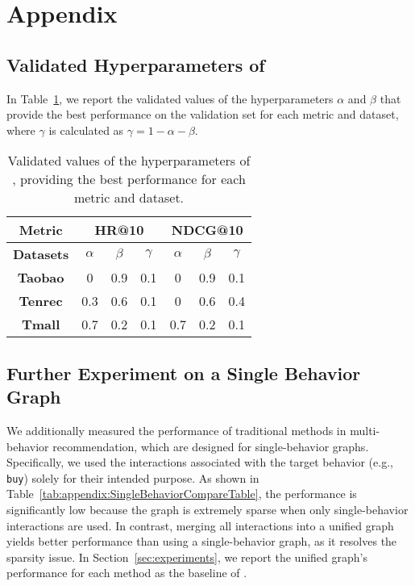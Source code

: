 \newpage
\appendix
\section{Appendix}
\label{sec:appendix}

\subsection{Validated Hyperparameters of \method}
\label{sec:appendix:Effect of Hyperparameters_detail}
In Table~\ref{tab:appendix:besthyperparameter}, we report the validated values of the hyperparameters $\alpha$ and $\beta$ that provide the best performance on the validation set for each metric and dataset, where $\gamma$ is calculated as $\gamma = 1 - \alpha - \beta$.

\setlength{\tabcolsep}{15pt}
\begin{table}[h!]
\small
\caption{
    Validated values of the hyperparameters of \method, providing the best performance for each metric and dataset.
}
\label{tab:appendix:besthyperparameter}
\centering
\begin{tabular}{c|ccc|ccc}
\hline
\toprule
\textbf{Metric}  & \multicolumn{3}{c|}{\textbf{HR@10}} & \multicolumn{3}{c}{\textbf{NDCG@10}} \\
\midrule
\textbf{Datasets} & $\alpha$ & $\beta$ & $\gamma$ & $\alpha$ & $\beta$ & $\gamma$  \\
\midrule
\textbf{Taobao}  & 0              & 0.9   & 0.1         & 0               & 0.9 & 0.1             \\
\textbf{Tenrec}  & 0.3            & 0.6   & 0.1         & 0               & 0.6 & 0.4 \\
\textbf{Tmall}   & 0.7            & 0.2   & 0.1         & 0.7             & 0.2 & 0.1            \\
\bottomrule\hline
\end{tabular}
\end{table}


\subsection{Further Experiment on a Single Behavior Graph} 
\label{sec:appendix:single}

We additionally measured the performance of traditional methods in multi-behavior recommendation, which are designed for single-behavior graphs. 
Specifically, we used the interactions associated with the target behavior (e.g., \texttt{buy}) solely for their intended purpose.
As shown in Table~\ref{tab:appendix:SingleBehaviorCompareTable}, the performance is significantly low because the graph is extremely sparse when only single-behavior interactions are used.
In contrast, merging all interactions into a unified graph yields better performance than using a single-behavior graph, as it resolves the sparsity issue.
In Section~\ref{sec:experiments}, we report the unified graph's performance for each method as the baseline of \method.


